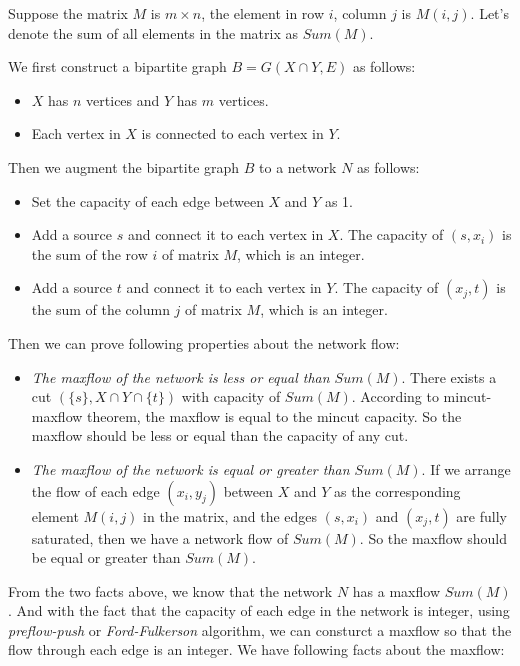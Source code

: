 
Suppose the matrix $M$ is $m \times n$, the element in row $i$, column $j$ is $M(i, j)$. Let's denote the sum of all elements in the matrix as $Sum(M)$.

We first construct a bipartite graph $B = G(X \cap Y, E)$ as follows:

\begin{itemize}
  \item $X$ has $n$ vertices and $Y$ has $m$ vertices.
  \item Each vertex in $X$ is connected to each vertex in $Y$.
\end{itemize}

Then we augment the bipartite graph $B$ to a network $N$ as follows:

\begin{itemize}
  \item Set the capacity of each edge between $X$ and $Y$ as 1.
  \item Add a source $s$ and connect it to each vertex in $X$. The capacity of $(s, x_i)$ is the sum of the row $i$ of matrix $M$, which is an integer.
  \item Add a source $t$ and connect it to each vertex in $Y$. The capacity of $(x_j, t)$ is the sum of the column $j$ of matrix $M$, which is an integer.
\end{itemize}

Then we can prove following properties about the network flow:

\begin{itemize}
  \item \textit{The maxflow of the network is less or equal than $Sum(M)$}. There exists a cut $(\{s\}, X \cap Y \cap \{t\})$ with capacity of $Sum(M)$. According to mincut-maxflow theorem, the maxflow is equal to the mincut capacity. So the maxflow should be less or equal than the capacity of any cut.
  \item \textit{The maxflow of the network is equal or greater than $Sum(M)$}. If we arrange the flow of each edge $(x_i, y_j)$ between $X$ and $Y$ as the corresponding element $M(i, j)$ in the matrix, and the edges $(s, x_i)$ and $(x_j, t)$ are fully saturated, then we have a network flow of $Sum(M)$. So the maxflow should be equal or greater than $Sum(M)$.
\end{itemize}

From the two facts above, we know that the network $N$ has a maxflow $Sum(M)$. And with the fact that the capacity of each edge in the network is integer, using \textit{preflow-push} or \textit{Ford-Fulkerson} algorithm, we can consturct a maxflow so that the flow through each edge is an integer. We have following facts about the maxflow:

